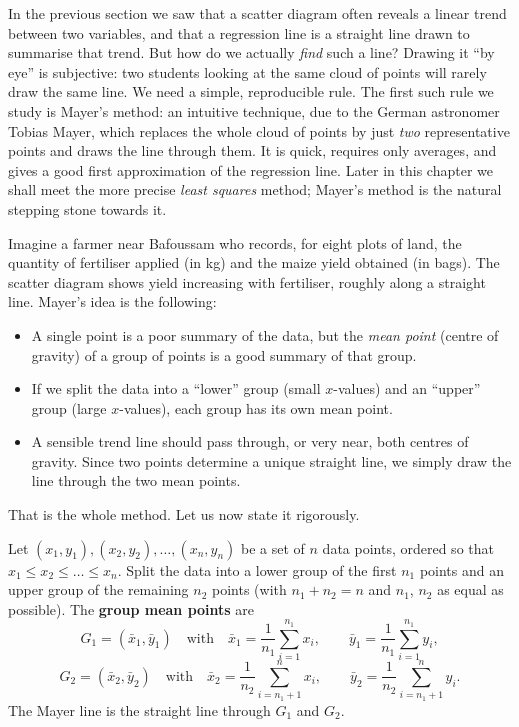 \documentclass[11pt]{article}
\newcommand{\cle}[1]{{\popxbold\color{popdark}#1}}
\newcounter{popsec}
\newcounter{popsub}
\newcommand{\courssub}[1]{%
  \stepcounter{popsub}%
  \par\vspace{9pt}\noindent{\popxbold\fontsize{11.5}{13}\selectfont\color{popink}{\color{poporange}\thepopsec.\thepopsub}\hspace{6pt}#1}\par\nopagebreak\vspace{4pt}
}
\begin{document}
In the previous section we saw that a scatter diagram often reveals a linear trend between two variables, and that a regression line is a straight line drawn to summarise that trend. But how do we actually \emph{find} such a line? Drawing it ``by eye'' is subjective: two students looking at the same cloud of points will rarely draw the same line. We need a simple, reproducible rule. The first such rule we study is \cle{Mayer's method}: an intuitive technique, due to the German astronomer Tobias Mayer, which replaces the whole cloud of points by just \emph{two} representative points and draws the line through them. It is quick, requires only averages, and gives a good first approximation of the regression line. Later in this chapter we shall meet the more precise \emph{least squares} method; Mayer's method is the natural stepping stone towards it.

\courssub{The Intuition Behind Mayer's Method}

Imagine a farmer near Bafoussam who records, for eight plots of land, the quantity of fertiliser applied (in kg) and the maize yield obtained (in bags). The scatter diagram shows yield increasing with fertiliser, roughly along a straight line. Mayer's idea is the following:

\begin{itemize}
\item A single point is a poor summary of the data, but the \emph{mean point} (centre of gravity) of a group of points is a good summary of that group.
\item If we split the data into a ``lower'' group (small $x$-values) and an ``upper'' group (large $x$-values), each group has its own mean point.
\item A sensible trend line should pass through, or very near, both centres of gravity. Since two points determine a unique straight line, we simply draw the line through the two mean points.
\end{itemize}

That is the whole method. Let us now state it rigorously.

\begin{definition}
Let $(x_1,y_1),(x_2,y_2),\dots,(x_n,y_n)$ be a set of $n$ data points, ordered so that $x_1 \le x_2 \le \dots \le x_n$. Split the data into a \cle{lower group} of the first $n_1$ points and an \cle{upper group} of the remaining $n_2$ points (with $n_1+n_2=n$ and $n_1$, $n_2$ as equal as possible). The \textbf{group mean points} are
\[
G_1=(\bar{x}_1,\bar{y}_1) \quad\text{with}\quad \bar{x}_1=\frac{1}{n_1}\sum_{i=1}^{n_1}x_i,\qquad \bar{y}_1=\frac{1}{n_1}\sum_{i=1}^{n_1}y_i,
\]
\[
G_2=(\bar{x}_2,\bar{y}_2) \quad\text{with}\quad \bar{x}_2=\frac{1}{n_2}\sum_{i=n_1+1}^{n}x_i,\qquad \bar{y}_2=\frac{1}{n_2}\sum_{i=n_1+1}^{n}y_i.
\]
The \cle{Mayer line} is the straight line through $G_1$ and $G_2$.
\end{definition}
\end{document}
